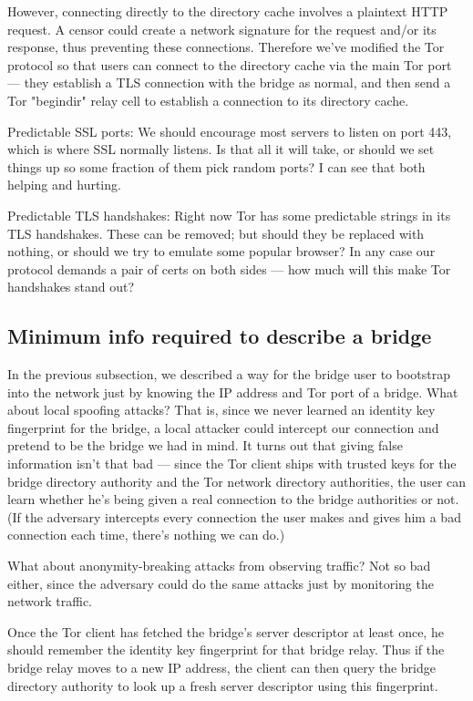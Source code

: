 \documentclass{llncs}
\begin{document}
However, connecting directly to the directory cache involves a plaintext
HTTP request. A censor could create a network signature for the
request and/or its response, thus preventing these connections. Therefore
we've modified the Tor protocol so that users can connect to the directory
cache via the main Tor port --- they establish a TLS connection with
the bridge as normal, and then send a Tor "begindir" relay cell to
establish a connection to its directory cache.

Predictable SSL ports:
We should encourage most servers to listen on port 443, which is
where SSL normally listens.
Is that all it will take, or should we set things up so some fraction
of them pick random ports? I can see that both helping and hurting.

Predictable TLS handshakes:
Right now Tor has some predictable strings in its TLS handshakes.
These can be removed; but should they be replaced with nothing, or
should we try to emulate some popular browser? In any case our
protocol demands a pair of certs on both sides --- how much will this
make Tor handshakes stand out?

\subsection{Minimum info required to describe a bridge}

In the previous subsection, we described a way for the bridge user
to bootstrap into the network just by knowing the IP address and
Tor port of a bridge. What about local spoofing attacks? That is,
since we never learned an identity key fingerprint for the bridge,
a local attacker could intercept our connection and pretend to be
the bridge we had in mind. It turns out that giving false information
isn't that bad --- since the Tor client ships with trusted keys for the
bridge directory authority and the Tor network directory authorities,
the user can learn whether he's being given a real connection to the
bridge authorities or not. (If the adversary intercepts every connection
the user makes and gives him a bad connection each time, there's nothing
we can do.)

What about anonymity-breaking attacks from observing traffic? Not so bad
either, since the adversary could do the same attacks just by monitoring
the network traffic.

Once the Tor client has fetched the bridge's server descriptor at least
once, he should remember the identity key fingerprint for that bridge
relay. Thus if the bridge relay moves to a new IP address, the client
can then query the bridge directory authority to look up a fresh server
descriptor using this fingerprint.
\end{document}

